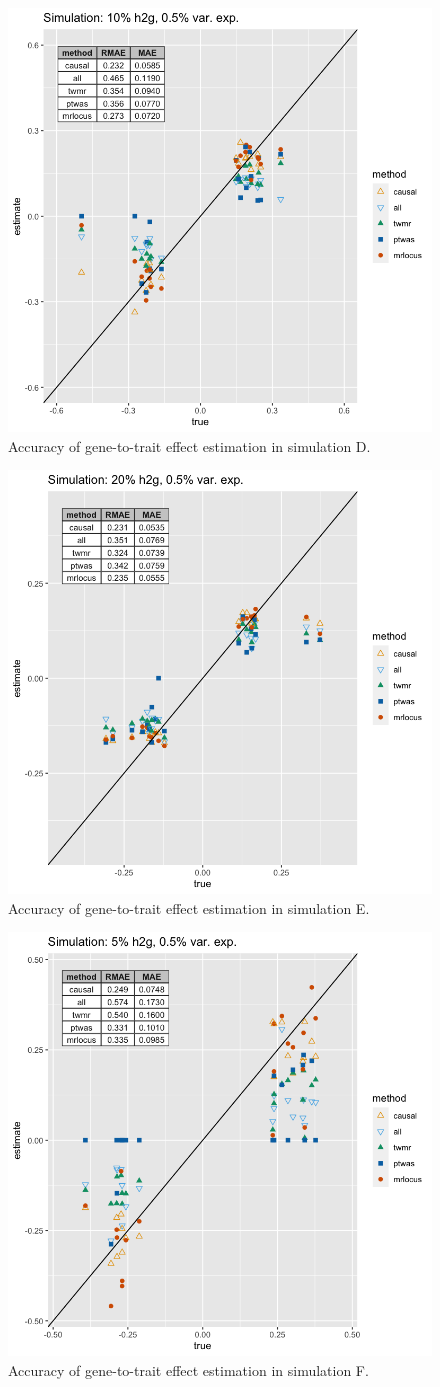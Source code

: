 \documentclass[11pt]{article}
\begin{document}
\begin{figure}[!ht]
  \centering
  \includegraphics[width=.6\textwidth]{figs/sim4.png}
  \caption{Accuracy of gene-to-trait effect estimation in simulation D.}
\end{figure}

\begin{figure}[!ht]
  \centering
  \includegraphics[width=.6\textwidth]{figs/sim6.png}
  \caption{Accuracy of gene-to-trait effect estimation in simulation E.}
\end{figure}

\begin{figure}[!ht]
  \centering
  \includegraphics[width=.6\textwidth]{figs/sim8.png}
  \caption{Accuracy of gene-to-trait effect estimation in simulation F.}
\end{figure}
\end{document}
